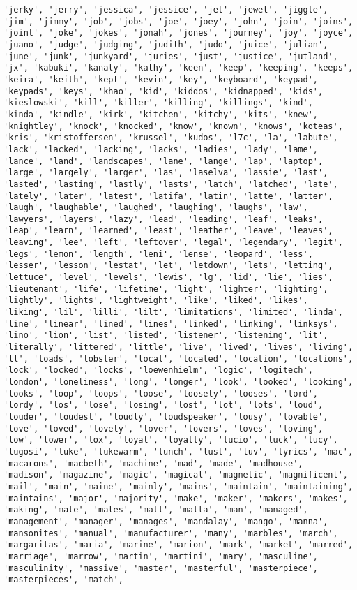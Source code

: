 \documentclass[11pt]{article}
\begin{document}
\begin{Verbatim}[commandchars=\\\{\}]
'jerky', 'jerry', 'jessica', 'jessice', 'jet', 'jewel', 'jiggle', 'jim', 'jimmy', 'job', 'jobs', 'joe', 'joey', 'john', 'join', 'joins', 'joint', 'joke', 'jokes', 'jonah', 'jones', 'journey', 'joy', 'joyce', 'juano', 'judge', 'judging', 'judith', 'judo', 'juice', 'julian', 'june', 'junk', 'junkyard', 'juries', 'just', 'justice', 'jutland', 'jx', 'kabuki', 'kanaly', 'kathy', 'keen', 'keep', 'keeping', 'keeps', 'keira', 'keith', 'kept', 'kevin', 'key', 'keyboard', 'keypad', 'keypads', 'keys', 'khao', 'kid', 'kiddos', 'kidnapped', 'kids', 'kieslowski', 'kill', 'killer', 'killing', 'killings', 'kind', 'kinda', 'kindle', 'kirk', 'kitchen', 'kitchy', 'kits', 'knew', 'knightley', 'knock', 'knocked', 'know', 'known', 'knows', 'koteas', 'kris', 'kristoffersen', 'krussel', 'kudos', 'l7c', 'la', 'labute', 'lack', 'lacked', 'lacking', 'lacks', 'ladies', 'lady', 'lame', 'lance', 'land', 'landscapes', 'lane', 'lange', 'lap', 'laptop', 'large', 'largely', 'larger', 'las', 'laselva', 'lassie', 'last', 'lasted', 'lasting', 'lastly', 'lasts', 'latch', 'latched', 'late', 'lately', 'later', 'latest', 'latifa', 'latin', 'latte', 'latter', 'laugh', 'laughable', 'laughed', 'laughing', 'laughs', 'law', 'lawyers', 'layers', 'lazy', 'lead', 'leading', 'leaf', 'leaks', 'leap', 'learn', 'learned', 'least', 'leather', 'leave', 'leaves', 'leaving', 'lee', 'left', 'leftover', 'legal', 'legendary', 'legit', 'legs', 'lemon', 'length', 'leni', 'lense', 'leopard', 'less', 'lesser', 'lesson', 'lestat', 'let', 'letdown', 'lets', 'letting', 'lettuce', 'level', 'levels', 'lewis', 'lg', 'lid', 'lie', 'lies', 'lieutenant', 'life', 'lifetime', 'light', 'lighter', 'lighting', 'lightly', 'lights', 'lightweight', 'like', 'liked', 'likes', 'liking', 'lil', 'lilli', 'lilt', 'limitations', 'limited', 'linda', 'line', 'linear', 'lined', 'lines', 'linked', 'linking', 'linksys', 'lino', 'lion', 'list', 'listed', 'listener', 'listening', 'lit', 'literally', 'littered', 'little', 'live', 'lived', 'lives', 'living', 'll', 'loads', 'lobster', 'local', 'located', 'location', 'locations', 'lock', 'locked', 'locks', 'loewenhielm', 'logic', 'logitech', 'london', 'loneliness', 'long', 'longer', 'look', 'looked', 'looking', 'looks', 'loop', 'loops', 'loose', 'loosely', 'looses', 'lord', 'lordy', 'los', 'lose', 'losing', 'lost', 'lot', 'lots', 'loud', 'louder', 'loudest', 'loudly', 'loudspeaker', 'lousy', 'lovable', 'love', 'loved', 'lovely', 'lover', 'lovers', 'loves', 'loving', 'low', 'lower', 'lox', 'loyal', 'loyalty', 'lucio', 'luck', 'lucy', 'lugosi', 'luke', 'lukewarm', 'lunch', 'lust', 'luv', 'lyrics', 'mac', 'macarons', 'macbeth', 'machine', 'mad', 'made', 'madhouse', 'madison', 'magazine', 'magic', 'magical', 'magnetic', 'magnificent', 'mail', 'main', 'maine', 'mainly', 'mains', 'maintain', 'maintaining', 'maintains', 'major', 'majority', 'make', 'maker', 'makers', 'makes', 'making', 'male', 'males', 'mall', 'malta', 'man', 'managed', 'management', 'manager', 'manages', 'mandalay', 'mango', 'manna', 'mansonites', 'manual', 'manufacturer', 'many', 'marbles', 'march', 'margaritas', 'maria', 'marine', 'marion', 'mark', 'market', 'marred', 'marriage', 'marrow', 'martin', 'martini', 'mary', 'masculine', 'masculinity', 'massive', 'master', 'masterful', 'masterpiece', 'masterpieces', 'match', 
\end{Verbatim}
\end{document}
